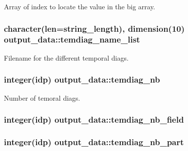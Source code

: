 Array of index to locate the value in the big array. 

\subsubsection[{\texorpdfstring{temdiag\+\_\+name\+\_\+list}{temdiag_name_list}}]{\setlength{\rightskip}{0pt plus 5cm}character(len=string\+\_\+length), dimension(10) output\+\_\+data\+::temdiag\+\_\+name\+\_\+list}\hypertarget{namespaceoutput__data_a891f4f8be197dbbfe91c01ee5260b4c2}{}\label{namespaceoutput__data_a891f4f8be197dbbfe91c01ee5260b4c2}


Filename for the different temporal diags. 

\subsubsection[{\texorpdfstring{temdiag\+\_\+nb}{temdiag_nb}}]{\setlength{\rightskip}{0pt plus 5cm}integer(idp) output\+\_\+data\+::temdiag\+\_\+nb}\hypertarget{namespaceoutput__data_a996655a7d030216dcce6367a59b22ae8}{}\label{namespaceoutput__data_a996655a7d030216dcce6367a59b22ae8}


Number of temoral diags. 

\subsubsection[{\texorpdfstring{temdiag\+\_\+nb\+\_\+field}{temdiag_nb_field}}]{\setlength{\rightskip}{0pt plus 5cm}integer(idp) output\+\_\+data\+::temdiag\+\_\+nb\+\_\+field}\hypertarget{namespaceoutput__data_a6e3150da1e4314b418b4f40c56737551}{}\label{namespaceoutput__data_a6e3150da1e4314b418b4f40c56737551}
\subsubsection[{\texorpdfstring{temdiag\+\_\+nb\+\_\+part}{temdiag_nb_part}}]{\setlength{\rightskip}{0pt plus 5cm}integer(idp) output\+\_\+data\+::temdiag\+\_\+nb\+\_\+part}\hypertarget{namespaceoutput__data_a950d70a052698f77988f39da1fddf632}{}\label{namespaceoutput__data_a950d70a052698f77988f39da1fddf632}


